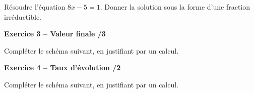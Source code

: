 \documentclass[10pt,a4paper]{article}
\begin{document}
Résoudre l'équation \(8x-5=1\). Donner la solution sous la forme d'une fraction irréductible.

\vspace{4cm}

\textbf{Exercice 3 -- Valeur finale \hfill /3}

Compléter le schéma suivant, en justifiant par un calcul.


\vspace{3.5cm}

\textbf{Exercice 4 -- Taux d'évolution \hfill /2}

Compléter le schéma suivant, en justifiant par un calcul.

\end{document}
